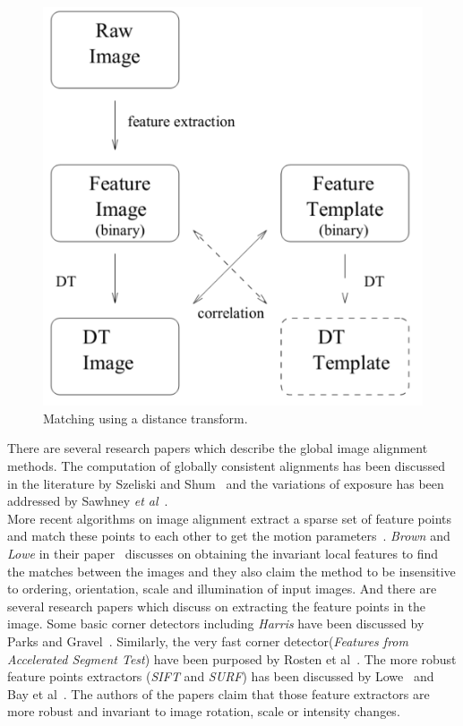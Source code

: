 \begin{figure}%
\begin{center}
\includegraphics[width=0.5\columnwidth]{2.mainmatter/1.Introduction/figures/chamfer-matching}%
\caption[Matching Using a DT]{Matching using a distance transform. }%
\label{fig:matching-dt}%
\end{center}
\end{figure}

\noindent There are several research papers which describe the global image alignment methods. The computation of globally consistent alignments has been discussed in the literature by Szeliski and Shum~\cite{Szeliski:97} and the variations of exposure has been addressed by Sawhney \textit{et al}~\cite{Sawhney:99}.\\ 


\noindent More recent algorithms on image alignment extract a sparse set of feature points and match these points to each other to get the motion parameters~\cite{Szeliski:06}. \emph{Brown} and \emph{Lowe} in their paper~\cite{Brown:02} discusses on obtaining the invariant local features to find the matches between the images and they also claim the method to be insensitive to ordering, orientation, scale and illumination of input images. And there are several research papers which discuss on extracting the feature points in the image. Some basic corner detectors including \emph{Harris} have been discussed by Parks and Gravel~\cite{Parks:11}. Similarly, the very fast corner detector(\emph{Features from Accelerated Segment Test}) have been purposed by Rosten et al~\cite{Rosten:06}. The more robust feature points extractors (\emph{SIFT} and \emph{SURF}) has been discussed by Lowe~\cite{Lowe:04} and Bay et al~\cite{Bay:08}. The authors of the papers claim that those feature extractors are more robust and invariant to image rotation, scale or intensity changes. 





 